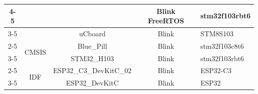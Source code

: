 \documentclass{book}
\begin{document}
{\begin{tabular}{|c|c|c|c|p{8cm}|}
\cline{4-5}
 &  &   & \multirow{1}{*}{Blink FreeRTOS} & stm32f103rbt6\\
\cline{3-5}
 &  & \multirow{1}{*}{uCboard}  & \multirow{1}{*}{Blink} & STM8S103\\
\cline{2-5}
 & \multirow{2}{*}{CMSIS} & \multirow{1}{*}{Blue\_Pill}  & \multirow{1}{*}{Blink} & stm32f103c8t6\\
\cline{3-5}
 &  & \multirow{1}{*}{STM32\_H103}  & \multirow{1}{*}{Blink} & stm32f103rbt6\\
\cline{2-5}
 & \multirow{2}{*}{IDF} & \multirow{1}{*}{ESP32\_C3\_DevKitC\_02}  & \multirow{1}{*}{Blink} & ESP32-C3\\
\cline{3-5}
 &  & \multirow{1}{*}{ESP32\_DevKitC}  & \multirow{1}{*}{Blink} & ESP32\\
\hline
\end{tabular}

}
\end{document}
